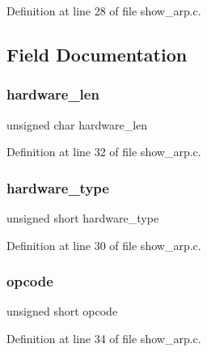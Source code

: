 Definition at line 28 of file show\+\_\+arp.\+c.



\subsection{Field Documentation}
\hypertarget{structarp__header_a63496664c0728baa8b8f213864290325}{}\label{structarp__header_a63496664c0728baa8b8f213864290325} 
\subsubsection{\texorpdfstring{hardware\+\_\+len}{hardware\_len}}
{\footnotesize\ttfamily unsigned char hardware\+\_\+len}



Definition at line 32 of file show\+\_\+arp.\+c.

\hypertarget{structarp__header_a26f790af15777120447eddb59c15bc7d}{}\label{structarp__header_a26f790af15777120447eddb59c15bc7d} 
\subsubsection{\texorpdfstring{hardware\+\_\+type}{hardware\_type}}
{\footnotesize\ttfamily unsigned short hardware\+\_\+type}



Definition at line 30 of file show\+\_\+arp.\+c.

\hypertarget{structarp__header_a8c0824ace997e9dda49fb5116a02fc65}{}\label{structarp__header_a8c0824ace997e9dda49fb5116a02fc65} 
\subsubsection{\texorpdfstring{opcode}{opcode}}
{\footnotesize\ttfamily unsigned short opcode}



Definition at line 34 of file show\+\_\+arp.\+c.

\hypertarget{structarp__header_a199abced9d3b3367a4ed4125e63ce9d4}{}\label{structarp__header_a199abced9d3b3367a4ed4125e63ce9d4} 
